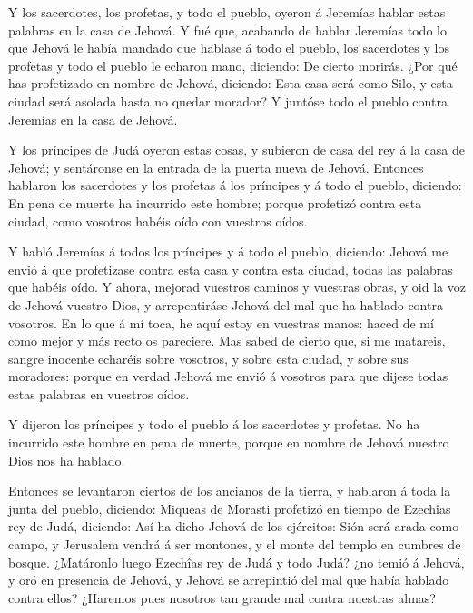 Y los sacerdotes, los profetas, y todo el pueblo, oyeron á
Jeremías hablar estas palabras en la casa de Jehová.  Y fué
que, acabando de hablar Jeremías todo lo que Jehová le había mandado que
hablase á todo el pueblo, los sacerdotes y los profetas y todo el pueblo
le echaron mano, diciendo: De cierto morirás.  ¿Por qué has
profetizado en nombre de Jehová, diciendo: Esta casa será como Silo, y
esta ciudad será asolada hasta no quedar morador? Y juntóse todo el
pueblo contra Jeremías en la casa de Jehová.

 Y los príncipes de Judá oyeron estas cosas, y subieron de
casa del rey á la casa de Jehová; y sentáronse en la entrada de la
puerta nueva de Jehová.  Entonces hablaron los sacerdotes y
los profetas á los príncipes y á todo el pueblo, diciendo: En pena de
muerte ha incurrido este hombre; porque profetizó contra esta ciudad,
como vosotros habéis oído con vuestros oídos.

 Y habló Jeremías á todos los príncipes y á todo el pueblo,
diciendo: Jehová me envió á que profetizase contra esta casa y contra
esta ciudad, todas las palabras que habéis oído.  Y ahora,
mejorad vuestros caminos y vuestras obras, y oid la voz de Jehová
vuestro Dios, y arrepentiráse Jehová del mal que ha hablado contra
vosotros.  En lo que á mí toca, he aquí estoy en vuestras
manos: haced de mí como mejor y más recto os pareciere. 
Mas sabed de cierto que, si me matareis, sangre inocente echaréis sobre
vosotros, y sobre esta ciudad, y sobre sus moradores: porque en verdad
Jehová me envió á vosotros para que dijese todas estas palabras en
vuestros oídos.

 Y dijeron los príncipes y todo el pueblo á los sacerdotes
y profetas. No ha incurrido este hombre en pena de muerte, porque en
nombre de Jehová nuestro Dios nos ha hablado.

 Entonces se levantaron ciertos de los ancianos de la
tierra, y hablaron á toda la junta del pueblo, diciendo: 
Miqueas de Morasti profetizó en tiempo de Ezechîas rey de Judá,
diciendo: Así ha dicho Jehová de los ejércitos: Sión será arada como
campo, y Jerusalem vendrá á ser montones, y el monte del templo en
cumbres de bosque.  ¿Matáronlo luego Ezechîas rey de Judá y
todo Judá? ¿no temió á Jehová, y oró en presencia de Jehová, y Jehová se
arrepintió del mal que había hablado contra ellos? ¿Haremos pues
nosotros tan grande mal contra nuestras almas?

